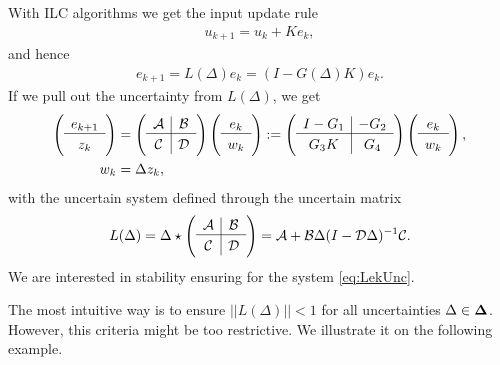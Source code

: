 With ILC algorithms we get the input update rule
\begin{align}
u_{k+1} = u_k + Ke_k,
\end{align}
and hence 
\begin{align}
\label{eq:LekUnc}
e_{k+1} = L(\Delta)e_k = (I - G(\Delta)K) e_k.
\end{align}
If we pull out the uncertainty from $L(\Delta)$, we get 
%
\begin{align}
\begin{split}
\left(\begin{array}{c}
e_{k+1} \\ \hline z_k
\end{array}\right) &= 
\left(\begin{array}{c| c}
\c{A} & \c{B} \\
\hline
\c{C} & \c{D}
\end{array}\right) \left(\begin{array}{c}
e_{k}  \\\hline w_k
\end{array}\right):= 
\left(\begin{array}{c|c}
I - G_1 & -G_2 \\
\hline
G_3 K & G_4
\end{array}\right)
\left(\begin{array}{c}
e_{k}  \\\hline w_k
\end{array}\right),\\
w_k &= \Delta z_k,
\end{split}
\end{align}
with the uncertain system defined through the uncertain matrix 
\begin{align}
\label{eq: LstarDelta}
L(\Delta) = \Delta \star \left(\begin{array}{c| c}
\c{A} & \c{B} \\
\hline
\c{C} & \c{D}
\end{array}\right) = \c{A} + \c{B} \Delta (I - \c{D}\Delta)^{-1}\c{C}. 
\end{align}
 We are interested in stability ensuring for the system \eqref{eq:LekUnc}. 
 
 The most intuitive way is to ensure $||L(\Delta)||<1$ for all uncertainties $\Delta \in \mathbf{\Delta}$.
However, this criteria might be too restrictive. We illustrate it on the following example. 


